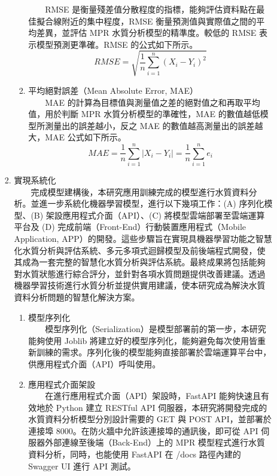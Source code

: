 \documentclass[12pt,a4paper]{article}
\begin{document}
\begin{enumerate}
\begin{enumerate}[label=\arabic*.]
\begin{enumerate}[label=2-2-\arabic*.]
\begin{enumerate}[label=\Alph*.]
                　　RMSE 是衡量殘差值分散程度的指標，能夠評估資料點在最佳擬合線附近的集中程度，RMSE 衡量預測值與實際值之間的平均差異，並評估 MPR 水質分析模型的精準度。較低的 RMSE 表示模型預測更準確。RMSE 的公式如下所示。
                    \begin{equation}
                    RMSE = \sqrt{\frac{1}{n} \sum_{i=1}^n (X_i - Y_i)^2}
                    \end{equation}
                \item 平均絕對誤差（Mean Absolute Error, MAE）\\
                　　MAE 的計算為目標值與測量值之差的絕對值之和再取平均值，用於判斷 MPR 水質分析模型的準確性，MAE 的數值越低模型所測量出的誤差越小，反之 MAE 的數值越高測量出的誤差越大，MAE 公式如下所示。
                    \begin{equation}
                    MAE = \frac{1}{n} \sum_{i=1}^n |X_i - Y_i| = \frac{1}{n} \sum_{i=1}^n e_i
                    \end{equation}
            \end{enumerate}
        \item 實現系統化\\
        　　完成模型建構後，本研究應用訓練完成的模型進行水質資料分析。並進一步系統化機器學習模型，進行以下幾項工作：(A) 序列化模型、(B) 架設應用程式介面（API）、(C) 將模型雲端部署至雲端運算平台及 (D) 完成前端（Front-End）行動裝置應用程式（Mobile Application, APP）的開發。這些步驟旨在實現具機器學習功能之智慧化水質分析與評估系統、多元多項式迴歸模型及前後端程式開發，使其成為一套完整的智慧化水質分析與評估系統。最終成果將包括能夠對水質狀態進行綜合評分，並針對各項水質問題提供改善建議。透過機器學習技術進行水質分析並提供實用建議，使本研究成為解決水質資料分析問題的智慧化解決方案。
            \begin{enumerate}[label=\Alph*.]
                \item 模型序列化\\
                　　模型序列化（Serialization）是模型部署前的第一步，本研究能夠使用 Joblib 將建立好的模型序列化，能夠避免每次使用皆重新訓練的需求。序列化後的模型能夠直接部署於雲端運算平台中，供應用程式介面（API）呼叫使用。
                \item 應用程式介面架設\\
                　　在進行應用程式介面（API）架設時，FastAPI 能夠快速且有效地於 Python 建立 RESTful API 伺服器，本研究將開發完成的水質資料分析模型分別設計需要的 GET 與 POST API，並部署於連接埠 8000。在防火牆中允許該連接埠的通訊後，即可從 API 伺服器外部連線至後端（Back-End）上的 MPR 模型程式進行水質資料分析，同時，也能使用 FastAPI 在 /docs 路徑內建的 Swagger UI 進行 API 測試。

\end{enumerate}
\end{enumerate}
\end{enumerate}
\end{enumerate}
\end{document}
